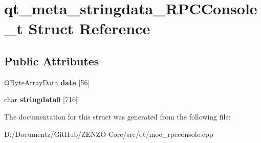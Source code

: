 \hypertarget{structqt__meta__stringdata___r_p_c_console__t}{}\section{qt\+\_\+meta\+\_\+stringdata\+\_\+\+R\+P\+C\+Console\+\_\+t Struct Reference}
\label{structqt__meta__stringdata___r_p_c_console__t}
\subsection*{Public Attributes}
\begin{DoxyCompactItemize}
\item 
\mbox{\label{structqt__meta__stringdata___r_p_c_console__t_a1c5112fde9cc491f5114b41961723ac4}} 
Q\+Byte\+Array\+Data {\bfseries data} \mbox{[}56\mbox{]}
\item 
\mbox{\label{structqt__meta__stringdata___r_p_c_console__t_ad90ccbf9939b315d440ef9694c4b5590}} 
char {\bfseries stringdata0} \mbox{[}716\mbox{]}
\end{DoxyCompactItemize}


The documentation for this struct was generated from the following file\+:\begin{DoxyCompactItemize}
\item 
D\+:/\+Documentz/\+Git\+Hub/\+Z\+E\+N\+Z\+O-\/\+Core/src/qt/moc\+\_\+rpcconsole.\+cpp\end{DoxyCompactItemize}

